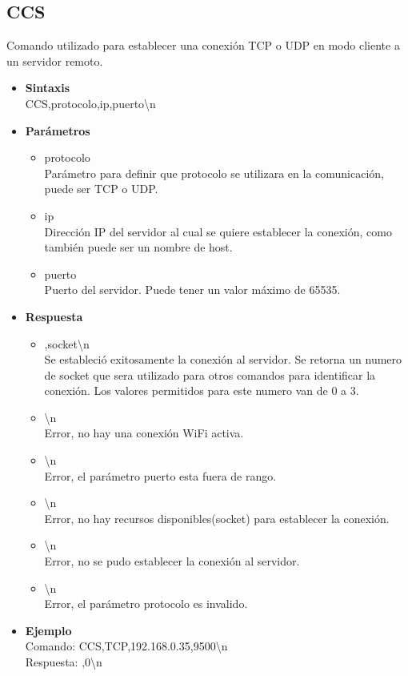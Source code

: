 \documentclass[a4paper,spanish]{article}
\begin{document}
\subsection{CCS}
Comando utilizado para establecer una conexión TCP o UDP en modo cliente a un servidor remoto.  
\begin{itemize}
	\item \textbf{Sintaxis}\\
	{\ttfamily CCS,protocolo,ip,puerto\textbackslash n}
	\item \textbf{Parámetros}
	\begin{itemize}
		\item{\ttfamily protocolo}\\
		Parámetro para definir que protocolo se utilizara en la comunicación, puede ser TCP o UDP.
		\item{\ttfamily ip}\\
		Dirección IP del servidor al cual se quiere establecer la conexión, como también puede ser un nombre de host.
		\item{\ttfamily puerto}\\
		Puerto del servidor. Puede tener un valor máximo de 65535.
	\end{itemize}
	\item \textbf{Respuesta}
	\begin{itemize}
		\item{,socket\textbackslash n} \\
		Se estableció exitosamente la conexión al servidor. Se retorna un numero de {\ttfamily socket} que sera utilizado para otros comandos para identificar la conexión. Los valores permitidos para este numero van de 0 a 3. 
		\item{\textbackslash n} \\
		Error, no hay una conexión WiFi activa.
		\item{\textbackslash n} \\
		Error, el parámetro {\ttfamily puerto} esta fuera de rango.
		\item{\textbackslash n} \\
		Error, no hay recursos disponibles(socket) para establecer la conexión.
		\item{\textbackslash n} \\
		Error, no se pudo establecer la conexión al servidor.
		\item{\textbackslash n} \\
		Error, el parámetro {\ttfamily protocolo} es invalido.
	\end{itemize} 
	\item \textbf{Ejemplo}\\
	Comando: {\ttfamily CCS,TCP,192.168.0.35,9500\textbackslash n}\\
	Respuesta: {,0\textbackslash n}
\end{itemize}
\end{document}
